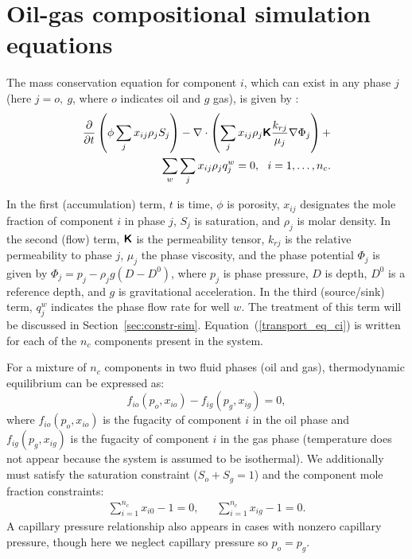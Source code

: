 \documentclass[twocolumn,numbook]{svjour3}          %
\begin{document}
\section{Oil-gas compositional simulation equations} \label{sec:forward}


The mass conservation equation for component $i$, which can exist in any
phase $j$ (here $j=o,~g$, where $o$ indicates oil and $g$ gas), is given
by \cite{Cao:Thesis,Voskov_nonlinear:2009,Voskov:2012}:
%
\begin{align}
\label{transport_eq_ci}
\dfrac{\partial}{\partial t} \left(\phi
  \sum_{j} x_{ij} \rho_j S_j \right)
    - \nabla \cdot \left ( \sum_{j} x_{ij} \rho_j  \boldsymbol{\mathsf{K}}
      \dfrac{k_{rj}}{\mu_j}\nabla \Phi_j \right ) + \\ \sum_{w} \sum_{j} x_{ij} \rho_j q_j^w = 0, \ \ i = 1,\ldots,n_c. \nonumber
\end{align}
%

In the first (accumulation) term, $t$ is time, $\phi$ is porosity, $x_{ij}$
designates the mole fraction of component $i$ in phase $j$, $S_j$ is saturation,
and $\rho_j$ is molar density. In the second (flow) term,  $\boldsymbol{\mathsf{K}}$ 
is the permeability tensor, $k_{rj}$ is the relative permeability to
phase $j$, $\mu_j$ the phase viscosity, and the phase potential
$\Phi_j$ is given by $\Phi_j = p_j-\rho_j g(D-D^0)$, where $p_j$ is
phase pressure, $D$ is depth, $D^0$ is a reference depth, and $g$ is
gravitational acceleration. In the third (source/sink) term, $q_j^w$
indicates the phase flow rate for well $w$. The treatment of this term will be discussed in Section~\ref{sec:constr-sim}. Equation~(\ref{transport_eq_ci}) is written for each of the $n_c$
components present in the system.

For a mixture of $n_c$ components in two fluid phases (oil and gas), thermodynamic equilibrium
can be expressed as:
%
\begin{equation} \label{general_therm_system1} f_{io}(p_o, x_{io}) - f_{ig}(p_g,
  x_{ig}) = 0,  \end{equation}
%
where $f_{io}(p_o, x_{io})$ is the fugacity of component $i$ in the oil phase and $f_{ig}(p_g, x_{ig})$ 
is the fugacity of component $i$ in the gas phase (temperature does not appear because the system is assumed to
be isothermal).
We additionally must satisfy the saturation constraint ($S_o+S_g=1$) and the
component mole fraction constraints:
%
\begin{align}\label{eqn:MoleFractionCons} \sum_{i=1}^{n_c} x_{i0} -1 = 0, \ \ \
    \ \ \ \ \sum_{i=1}^{n_c} x_{ig} -1 = 0.  \end{align}
%
A capillary pressure relationship also appears in cases with nonzero capillary
pressure, though here we neglect capillary pressure so $p_o=p_g$.
\end{document}
